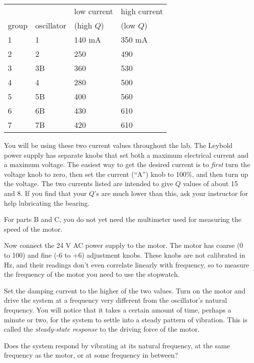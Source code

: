 \begin{tabular}{llll}
      &              & low current & high current \\
group & oscillator   & (high $Q$)  &    (low $Q$)\\
1     &      1       &   140  mA   &    350 mA \\
2     &      2       &   250       &    490  \\
3     &      3B      &   360       &    530 \\
4     &      4       &   280       &    500  \\
5     &      5B      &   400       &    560 \\
6     &      6B      &   430       &    610  \\
7     &      7B      &   420       &    610  
\end{tabular}

You will be using these two current
values throughout the lab.
The Leybold power supply has separate knobs that set both a maximum electrical
current and a maximum voltage. The easiest way to get the desired current is to
\emph{first} turn the voltage knob to zero, then set the current (``A'') knob
to 100\%, and then turn up the voltage. The two currents listed are intended
to give $Q$ values of about 15 and 8. If you find that your $Q$'s are much
lower than this, ask your instructor for help lubricating the bearing.

For parts B and C, you do not yet need the multimeter used for measuring the speed of the motor.


Now connect the 24 V AC power supply to the motor.
The motor has coarse (0 to 100) and fine (-6 to +6) adjustment knobs.
These knobs are not
calibrated in Hz, and their readings don't even correlate linearly with
frequency, so to measure the frequency of the motor you need to use the stopwatch.

Set the damping current to the higher of the two values.
Turn on the motor and drive the system at a frequency very
different from the oscillator's natural frequency. You will notice that
it takes a certain amount of time, perhaps a minute or two,
for the system to settle into a steady pattern of vibration.
This is called the \emph{steady-state response}
 to the driving force of the motor.

Does the system respond by vibrating at its natural
frequency, at the same frequency as the motor, or at some
frequency in between?


